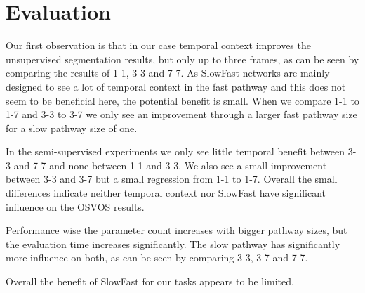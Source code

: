 \section{Evaluation}
Our first observation is that in our case temporal context improves the unsupervised segmentation results, but only up to three frames, as can be seen by comparing the results of 1-1, 3-3 and 7-7. As SlowFast networks are mainly designed to see a lot of temporal context in the fast pathway and this does not seem to be beneficial here, the potential benefit is small. When we compare 1-1 to 1-7 and 3-3 to 3-7 we only see an improvement through a larger fast pathway size for a slow pathway size of one.

In the semi-supervised experiments we only see little temporal benefit between 3-3 and 7-7 and none between 1-1 and 3-3. We also see a small improvement between 3-3 and 3-7 but a small regression from 1-1 to 1-7. Overall the small differences indicate neither temporal context nor SlowFast have significant influence on the OSVOS results.

Performance wise the parameter count increases with bigger pathway sizes, but the evaluation time increases significantly. The slow pathway has significantly more influence on both, as can be seen by comparing 3-3, 3-7 and 7-7.

Overall the benefit of SlowFast for our tasks appears to be limited. 